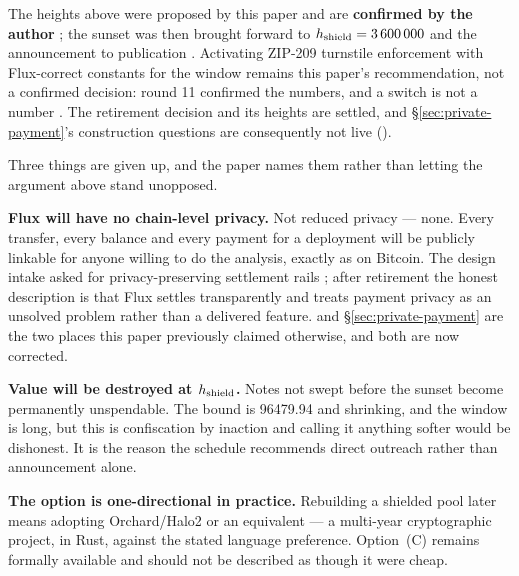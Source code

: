 \begin{remark}
\label{rem:shield-schedule-confirmed}
The heights above were proposed by this paper and are \textbf{confirmed by the author}
; the sunset was then brought forward to $h_{\mathrm{shield}} = \num{3600000}$ and the
announcement to publication . Activating ZIP-209 turnstile enforcement with Flux-correct constants for
the window remains this paper's recommendation, not a confirmed decision: round 11 confirmed the
numbers, and a switch is not a number . The retirement
decision and its heights are settled, and \S\ref{sec:private-payment}'s construction questions are
consequently not live ().
\end{remark}

\begin{remark}
\label{rem:retirement-cost}
Three things are given up, and the paper names them rather than letting the argument above stand
unopposed.

\textbf{Flux will have no chain-level privacy.} Not reduced privacy --- none. Every transfer, every
balance and every payment for a deployment will be publicly linkable for anyone willing to do the
analysis, exactly as on Bitcoin. The design intake asked for privacy-preserving settlement rails
; after retirement the honest description is that Flux settles
transparently and treats payment privacy as an unsolved problem rather than a delivered feature.
 and \S\ref{sec:private-payment} are the two places this paper previously
claimed otherwise, and both are now corrected.

\textbf{Value will be destroyed at $h_{\mathrm{shield}}$.} Notes not swept before the sunset become
permanently unspendable. The bound is \num{96479.94}\flux{} and shrinking, and the window is long,
but this is confiscation by inaction and calling it anything softer would be dishonest. It is the
reason the schedule recommends direct outreach rather than announcement alone.

\textbf{The option is one-directional in practice.} Rebuilding a shielded pool later means adopting
Orchard/Halo2 or an equivalent --- a multi-year cryptographic project, in Rust, against the stated
language preference. Option~(C) remains formally available and should not be described as though it
were cheap.
\end{remark}

\FloatBarrier
